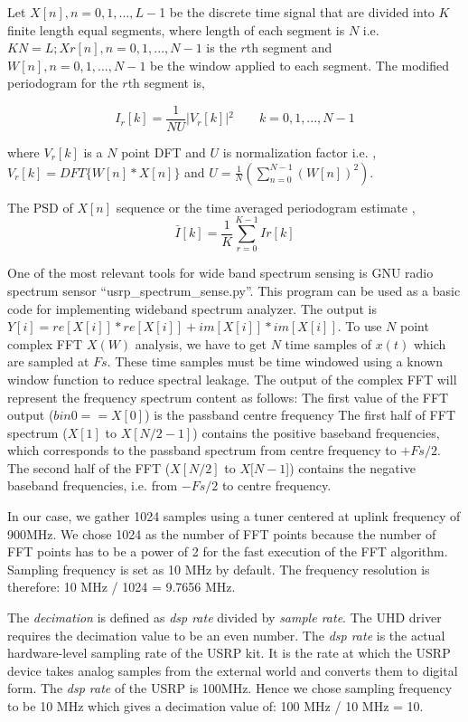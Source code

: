 Let $X[n], n=0,1,...,L-$1 be the discrete time signal that are divided into $K$ finite length equal segments,
where length of each segment is $N$ i.e. $KN = L; Xr[n], n= 0,1,..., N-1$ is the $r$th segment and $W[n], n=0,1,...,N-1$ be the window applied to each segment. The modified periodogram for the $r$th segment is,

\begin{equation*}
	I_{r}[k] = \frac{1}{NU}\vert{}V_{r}[k]\vert{}^2     \qquad k=0,1,...,N-1
\end{equation*}

where $V_{r}[k]$ is a $N$ point DFT and $U$ is normalization factor i.e. ,
$V_{r}[k] = DFT\{W[n]*X[n]\}$  and 
$U = \frac{1}{N}(\sum_{n=0}^{N-1}(W[n])^2)$.


The PSD of $X[n]$ sequence or the time averaged periodogram estimate ,
\begin{equation*}
\bar{I}[k] = \frac{1}{K}\sum_{r=0}^{K-1}Ir[k]
\end{equation*}

One of the most relevant tools for wide band spectrum sensing is GNU radio spectrum sensor \mbox{``usrp\_spectrum\_sense.py''.}
 This program can be used as a basic code for implementing wideband spectrum analyzer. The output is  $Y[i] = re[X[i]]*re[X[i]] + im[X[i]]*im[X[i]]$.
To use $N$ point complex FFT $X(W)$ analysis, we have to get $N$ time samples of $x(t)$  which are sampled at $Fs$. These time samples must be time windowed using a known window function to reduce spectral leakage. The output of the complex FFT will represent the frequency spectrum content as follows:
The first value of the FFT output ($bin 0 == X[0]$) is the passband centre frequency
The first half of FFT spectrum ($X[1]$ to $X[N/2-1]$) contains the positive baseband frequencies, which corresponds to the passband spectrum from centre frequency to $+Fs/2$.
The second half of the FFT ($X[N/2]$ to $X[N-1$]) contains the negative baseband frequencies, i.e. from $-Fs/2$ to centre frequency.

In our case, we  gather 1024 samples using a tuner centered at uplink frequency of 900MHz. We chose 1024 as the number of FFT points because the number of FFT points has to be a power of 2 for the fast execution of the FFT algorithm. Sampling frequency is set as 10 MHz by default. The frequency resolution is therefore: 10 MHz / 1024 = 9.7656 MHz.

The \emph{decimation} is defined as \emph{dsp rate} divided by \emph{sample rate}. The UHD driver requires the decimation value to be an even number. The \emph{dsp rate} is the actual hardware-level sampling rate of the USRP kit. It is the rate at which the USRP device takes analog samples from the external world and converts them to digital form.  The \emph{dsp rate} of the USRP is 100MHz. Hence we chose sampling frequency to be 10 MHz which gives a decimation value of: 100 MHz / 10 MHz = 10.

